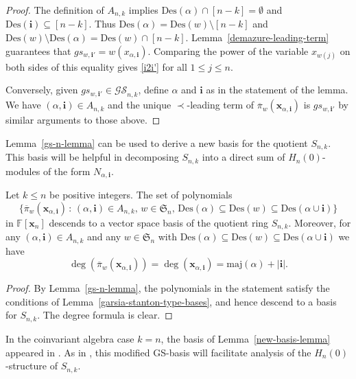 \documentclass[ALCO,ThmDefs,published]{cedram}
\newcommand{\symm}{{\mathfrak{S}}}
\newcommand{\xx}{{\mathbf {x}}}
\newcommand{\FF}{{\mathbb{F}}}
\theoremstyle{plain}
\newcommand{\maj}{{\mathrm {maj}}}
\newcommand{\Des}{{\mathrm {Des}}}
\newcommand{\symm}{{\mathfrak{S}}}
\newcommand{\FF}{{\mathbb{F}}}
\newcommand{\GS}{{\mathcal{GS}}}
\newcommand{\xx}{{\mathbf {x}}}
\newcommand{\ii}{{\mathbf{i}}}
\newcommand{\pib}{\overline{\pi}}
\begin{document}
\begin{proof}
The definition of $A_{n,k}$ implies $\Des(\alpha)\cap[n-k]=\emptyset$ and $\Des(\ii)\subseteq[n-k]$.
Thus $\Des(\alpha)=\Des(w)\setminus[n-k]$ and $\Des(w)\setminus\Des(\alpha)=\Des(w)\cap[n-k]$.
Lemma~\ref{demazure-leading-term} guarantees that $gs_{w,\ii'} = w(x_{\alpha,\ii})$.   
Comparing the power of the variable $x_{w(j)}$ 
on both sides of this equality gives \eqref{i2i'} for all $1 \leq j \leq n$.

Conversely, given $gs_{w,\ii'} \in \GS_{n,k}$,
define $\alpha$ and $\ii$ as in the statement of the lemma.  We have $(\alpha,\ii) \in A_{n,k}$
and the unique $\prec$-leading term of $\pib_w(\xx_{\alpha,\ii})$ is $gs_{w,\ii'}$ by 
similar arguments to those above.
\end{proof}



Lemma~\ref{gs-n-lemma} can be used to derive a new basis for the quotient  $S_{n,k}$.
This basis will be helpful in decomposing $S_{n,k}$ into a direct sum of
$H_n(0)$-modules of the form $N_{\alpha,\ii}$.

\begin{lemma}
\label{new-basis-lemma}
Let $k \leq n$ be positive integers.  The set of polynomials
\begin{equation}
\label{new-basis}
\{ \pib_w(\xx_{\alpha,\ii}) \,:\, (\alpha,\ii) \in A_{n,k}, \, w \in \symm_n, \, \Des(\alpha) \subseteq \Des(w) 
\subseteq \Des(\alpha \cup \ii) \}
\end{equation}
in $\FF[\xx_n]$ descends to a vector space basis of the quotient ring $S_{n,k}$.  Moreover, 
for any $(\alpha, \ii) \in A_{n,k}$ and any $w \in \symm_n$
with $\Des(\alpha) \subseteq \Des(w) \subseteq \Des(\alpha \cup \ii)$ we have
\begin{equation}
\label{degree-formula}
\deg( \pib_w(\xx_{\alpha,\ii}) ) = \deg( \xx_{\alpha,\ii}) = \maj(\alpha) + |\ii|.
\end{equation}
\end{lemma} 

\begin{proof}
By Lemma~\ref{gs-n-lemma}, the polynomials in the statement satisfy the conditions
of Lemma~\ref{garsia-stanton-type-bases}, and hence descend to a basis for $S_{n,k}$.
The degree formula is clear.
\end{proof}


In the coinvariant algebra
case $k = n$, the basis of Lemma~\ref{new-basis-lemma} appeared in \cite{Huang}.
As in \cite{Huang}, this modified GS-basis will facilitate analysis 
of the $H_n(0)$-structure of $S_{n,k}$.
\end{document}
